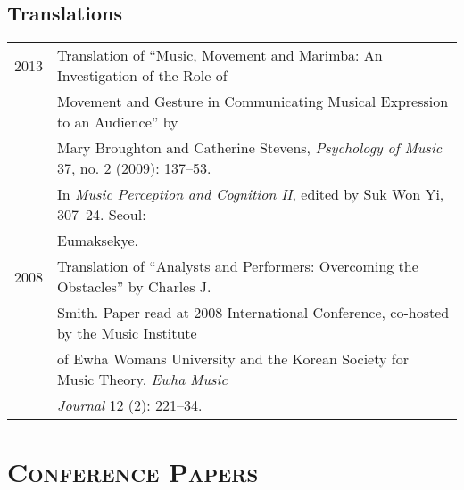 \documentclass[letter,11pt]{article}
\begin{document}
  \subsection*{Translations}
  \hspace*{-0.25cm}
  \begin{tabular}{p{2.5cm} p{12.5cm}}
    2013 & Translation of “Music, Movement and Marimba: An Investigation of the
    Role of\\
    & Movement and Gesture in Communicating Musical Expression to an Audience”
    by\\
    & Mary Broughton and Catherine Stevens, \textit{Psychology of Music} 37,
    no. 2 (2009): 137–53.\\
    & In \textit{Music Perception and Cognition II}, edited by Suk Won Yi,
    307–24. Seoul:\\
    & Eumaksekye.\\[2mm]
    
    2008 & Translation of “Analysts and Performers: Overcoming the Obstacles”
    by Charles J.\\
    & Smith. Paper read at 2008 International Conference, co-hosted by the
    Music Institute\\
    & of Ewha Womans University and the Korean Society for Music Theory.
    \textit{Ewha Music}\\
    & \textit{Journal} 12 (2): 221–34.
  \end{tabular}
  
  \section*{\textsc{Conference Papers}}
  
\end{document}

